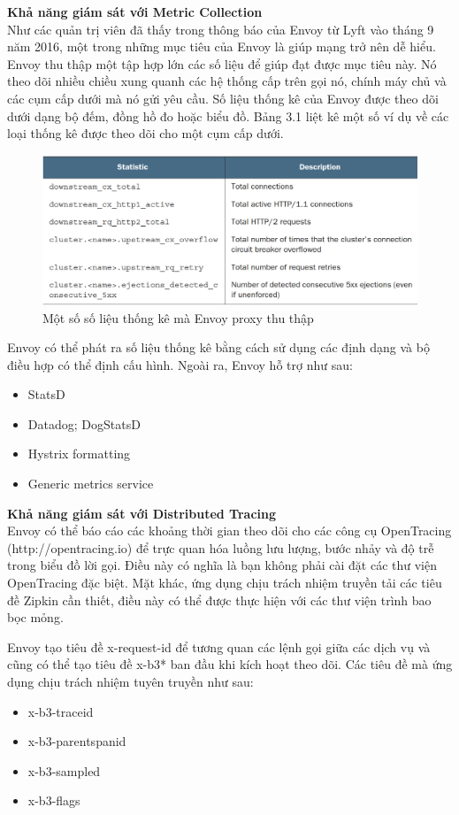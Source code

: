 \documentclass[12pt,a4paper]{report}
\begin{document}
		\textbf{Khả năng giám sát với Metric Collection}\\
		Như các quản trị viên đã thấy trong thông báo của Envoy từ Lyft vào tháng 9 năm 2016, một trong những mục tiêu của Envoy là giúp mạng trở nên dễ hiểu. Envoy thu thập một tập hợp lớn các số liệu để giúp đạt được mục tiêu này. Nó theo dõi nhiều chiều xung quanh các hệ thống cấp trên gọi nó, chính máy chủ và các cụm cấp dưới mà nó gửi yêu cầu. Số liệu thống kê của Envoy được theo dõi dưới dạng bộ đếm, đồng hồ đo hoặc biểu đồ. Bảng 3.1 liệt kê một số ví dụ về các loại thống kê được theo dõi cho một cụm cấp dưới.
		\begin{figure}[h]
			\centering
			\includegraphics[width=0.7\linewidth]{Pics/2.1.3-p4}
			\caption{Một số số liệu thống kê mà Envoy proxy thu thập}
			\label{fig:2.3.1-4}
		\end{figure}
		
		Envoy có thể phát ra số liệu thống kê bằng cách sử dụng các định dạng và bộ điều hợp có thể định cấu hình. Ngoài ra, Envoy hỗ trợ như sau:
		\begin{itemize}
			\item StatsD
			\item Datadog; DogStatsD
			\item Hystrix formatting
			\item Generic metrics service
		\end{itemize}
		
		\textbf{Khả năng giám sát với Distributed Tracing}\\
		Envoy có thể báo cáo các khoảng thời gian theo dõi cho các công cụ OpenTracing (http://opentracing.io) để trực quan hóa luồng lưu lượng, bước nhảy và độ trễ trong biểu đồ lời gọi. Điều này có nghĩa là bạn không phải cài đặt các thư viện OpenTracing đặc biệt. Mặt khác, ứng dụng chịu trách nhiệm truyền tải các tiêu đề Zipkin cần thiết, điều này có thể được thực hiện với các thư viện trình bao bọc mỏng.
		
		Envoy tạo tiêu đề x-request-id để tương quan các lệnh gọi giữa các dịch vụ và cũng có thể tạo tiêu đề x-b3* ban đầu khi kích hoạt theo dõi. Các tiêu đề mà ứng dụng chịu trách nhiệm tuyên truyền như sau:
		\begin{itemize}
			\item x-b3-traceid
			\item x-b3-parentspanid
			\item x-b3-sampled
			\item x-b3-flags
		\end{itemize}
		
\end{document}
